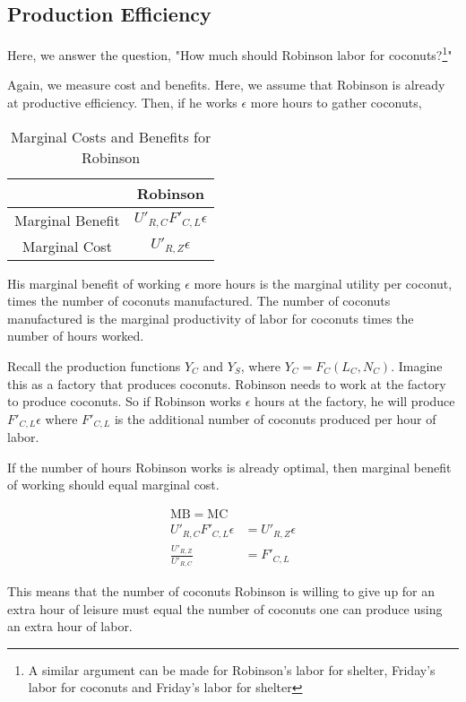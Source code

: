 \documentclass[11pt]{scrartcl}
\begin{document}
\subsection{Production Efficiency}

Here, we answer the question, "How much should Robinson labor for coconuts?\footnote{A similar argument can be made for Robinson's labor for shelter, Friday's labor for coconuts and Friday's labor for shelter}"

Again, we measure cost and benefits. Here, we assume that Robinson is already at productive efficiency. Then, if he works $\epsilon$ more hours to gather coconuts,

\begin{table}[ht!]
\begin{longtable}{c|c}
\hline
 & Robinson \\
\hline
Marginal Benefit & $U'_{R,C} F'_{C,L} \epsilon$ \\
Marginal Cost & $U'_{R,Z} \epsilon$ \\
\hline
\end{longtable}
\caption{Marginal Costs and Benefits for Robinson}
\end{table}

His marginal benefit of working $\epsilon$ more hours is the marginal utility per coconut, times the number of coconuts manufactured. The number of coconuts manufactured is the marginal productivity of labor for coconuts times the number of hours worked. 

Recall the production functions $Y_C$ and $Y_S$, where $Y_C = F_C(L_C, N_C)$. Imagine this as a factory that produces coconuts. Robinson needs to work at the factory to produce coconuts. So if Robinson works $\epsilon$ hours at the factory, he will produce $F'_{C,L} \epsilon$ where $F'_{C,L}$ is the additional number of coconuts produced per hour of labor. 

If the number of hours Robinson works is already optimal, then marginal benefit of working should equal marginal cost.

\begin{align*}
\mathrm{MB} = \mathrm{MC}\\
U'_{R,C} F'_{C,L} \epsilon &= U'_{R,Z} \epsilon \\
\frac{U'_{R,Z}}{U'_{R,C}} &= F'_{C,L} 
\end{align*}

This means that the number of coconuts Robinson is willing to give up for an extra hour of leisure must equal the number of coconuts one can produce using an extra hour of labor. 
\end{document}

